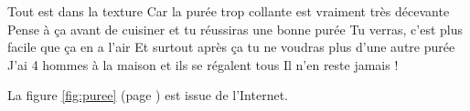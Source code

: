 \documentclass[10pt,a4paper]{article}
\begin{document}
\begin{center}
Tout est dans la texture \newline
Car la purée trop collante est vraiment très décevante \newline
Pense à ça avant de cuisiner et tu réussiras une bonne purée \newline
Tu verras, c'est plus facile que ça en a l'air \newline
Et surtout après ça tu ne voudras plus d'une autre purée \newline
J'ai 4 hommes à la maison et ils se régalent tous \newline
Il n'en reste jamais ! \newline
\end{center}

La figure \ref{fig:puree} (page \pageref{fig:puree}) est issue de l'Internet.
\end{document}
